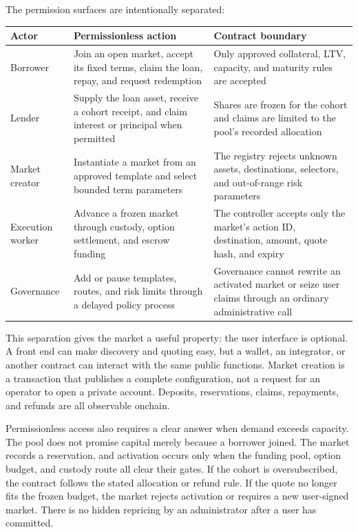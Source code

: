 \documentclass[11pt,oneside]{article}
\begin{document}
The permission surfaces are intentionally separated:

\begin{center}
\begin{tabularx}{\textwidth}{@{}p{}YY@{}}
\toprule
\textbf{Actor} & \textbf{Permissionless action} & \textbf{Contract boundary} \\
\midrule
Borrower & Join an open market, accept its fixed terms, claim the loan, repay, and request redemption & Only approved collateral, LTV, capacity, and maturity rules are accepted \\
Lender & Supply the loan asset, receive a cohort receipt, and claim interest or principal when permitted & Shares are frozen for the cohort and claims are limited to the pool's recorded allocation \\
Market creator & Instantiate a market from an approved template and select bounded term parameters & The registry rejects unknown assets, destinations, selectors, and out-of-range risk parameters \\
Execution worker & Advance a frozen market through custody, option settlement, and escrow funding & The controller accepts only the market's action ID, destination, amount, quote hash, and expiry \\
Governance & Add or pause templates, routes, and risk limits through a delayed policy process & Governance cannot rewrite an activated market or seize user claims through an ordinary administrative call \\
\bottomrule
\end{tabularx}
\end{center}

This separation gives the market a useful property: the user interface is
optional. A front end can make discovery and quoting easy, but a wallet, an
integrator, or another contract can interact with the same public functions.
Market creation is a transaction that publishes a complete configuration, not
a request for an operator to open a private account. Deposits, reservations,
claims, repayments, and refunds are all observable onchain.

Permissionless access also requires a clear answer when demand exceeds
capacity. The pool does not promise capital merely because a borrower joined.
The market records a reservation, and activation occurs only when the funding
pool, option budget, and custody route all clear their gates. If the cohort is
oversubscribed, the contract follows the stated allocation or refund rule. If
the quote no longer fits the frozen budget, the market rejects activation or
requires a new user-signed market. There is no hidden repricing by an
administrator after a user has committed.
\end{document}
